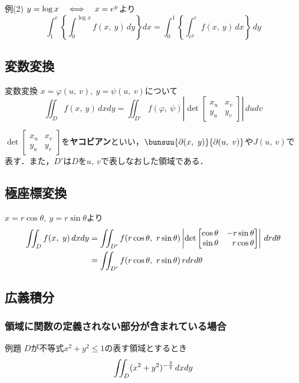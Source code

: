 \begin{tip}{例(2)}
	$y = \log x \quad\Longleftrightarrow\quad x = e^y$より
	\begin{equation*}
		\int_{1}^{e} \left\{\int_{0}^{\log x} f(x,\ y)\,dy\right\}dx = \int_{0}^{1} \left\{\int_{e^y}^{e} f(x,\ y)\,dx\right\}\,dy
	\end{equation*}
\end{tip}



\subsection{変数変換}

\begin{kousiki}{変数変換}
	$x = \varphi(u,\ v),\ y = \psi(u,\ v)$について
	\begin{equation}
		\iint_{D} f(x,\ y)\,dxdy = \iint_{D'} f(\varphi,\ \psi)\left|\det
			\begin{bmatrix}
				x_u & x_v\\ y_u & y_v
			\end{bmatrix}
		\right|\,dudv
	\end{equation}
\end{kousiki}

$\det\begin{bmatrix}
	x_u & x_v\\ y_u & y_v
\end{bmatrix}$を\textbf{ヤコビアン}といい，$\bunsuu{\partial(x,\ y)}{\partial(u,\ v)}$や$J(u,\ v)$で表す．また，$D'$は$D$を$u,\ v$で表しなおした領域である．



\subsection{極座標変換}

$x = r\cos\theta,\ y = r\sin\theta$より
\begin{align}
	\iint_{D} f(x,\ y)\,dxdy &= \iint_{D'} f(r\cos\theta,\ r\sin\theta) \left|\det
	\begin{bmatrix*}[r]
		\cos\theta & -r\sin\theta\\ \sin\theta & r\cos\theta
	\end{bmatrix*}
	\right|\,drd\theta \notag\\
	&= \iint_{D'} f(r\cos\theta,\ r\sin\theta)\,rdrd\theta
\end{align}



\subsection{広義積分}
\subsubsection*{領域に関数の定義されない部分が含まれている場合}

\begin{tip}{例題}
	$D$が不等式$x^2 + y^2 \le 1$の表す領域とするとき
	\begin{equation*}
		\iint_{D} (x^2 + y^2)^{-\myfrac{3}{4}}\,dxdy
	\end{equation*}
\end{tip}

\newpage